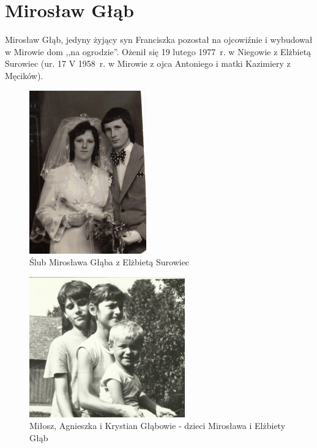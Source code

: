 \section{Mirosław Głąb}

Mirosław Głąb, jedyny żyjący syn Franciszka pozostał na ojcowiźnie i wybudował w Mirowie dom ,,na ogrodzie''. Ożenił się 19 lutego 1977~r. w Niegowie z Elżbietą Surowiec (ur. 17 V 1958~r. w Mirowie z ojca Antoniego i matki Kazimiery z Męcików).

\begin{figure}
\begin{center}
\includegraphics[width=0.45\textwidth]{zdjecia/slub_miroslawa_i_elzbiety_glabow.jpg}
\caption{Ślub Mirosława Głąba z Elżbietą Surowiec}
\label{rys:slub_miroslawa_i_elzbiety_glabow}
\end{center}
\end{figure}

\begin{figure}
\begin{center}
\includegraphics[width=0.6\textwidth]{zdjecia/dzieci_miroslawa_glaba.jpg}
\caption[Miłosz, Agnieszka i Krystian Głąbowie]{Miłosz, Agnieszka i Krystian Głąbowie - dzieci Mirosława i Elżbiety Głąb}
\label{rys:dzieci_miroslawa_glaba}
\end{center}
\end{figure}

